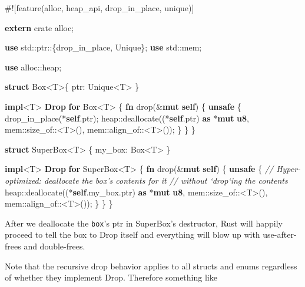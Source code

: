 \documentclass[a4paper,]{book}
\newenvironment{Shaded}{\begin{snugshade}}{\end{snugshade}}
\newcommand{\KeywordTok}[1]{\textcolor[rgb]{0.13,0.29,0.53}{\textbf{{#1}}}}
\newcommand{\CommentTok}[1]{\textcolor[rgb]{0.56,0.35,0.01}{\textit{{#1}}}}
\newcommand{\NormalTok}[1]{{#1}}
\begin{document}
\begin{Shaded}
\begin{Highlighting}[]
\NormalTok{#![feature(alloc, heap_api, drop_in_place, unique)]}

\KeywordTok{extern} \NormalTok{crate alloc;}

\KeywordTok{use} \NormalTok{std::ptr::\{drop_in_place, Unique\};}
\KeywordTok{use} \NormalTok{std::mem;}

\KeywordTok{use} \NormalTok{alloc::heap;}

\KeywordTok{struct} \NormalTok{Box<T>\{ ptr: Unique<T> \}}

\KeywordTok{impl}\NormalTok{<T> }\KeywordTok{Drop} \KeywordTok{for} \NormalTok{Box<T> \{}
    \KeywordTok{fn} \NormalTok{drop(&}\KeywordTok{mut} \KeywordTok{self}\NormalTok{) \{}
        \KeywordTok{unsafe} \NormalTok{\{}
            \NormalTok{drop_in_place(*}\KeywordTok{self}\NormalTok{.ptr);}
            \NormalTok{heap::deallocate((*}\KeywordTok{self}\NormalTok{.ptr) }\KeywordTok{as} \NormalTok{*}\KeywordTok{mut} \KeywordTok{u8}\NormalTok{,}
                             \NormalTok{mem::size_of::<T>(),}
                             \NormalTok{mem::align_of::<T>());}
        \NormalTok{\}}
    \NormalTok{\}}
\NormalTok{\}}

\KeywordTok{struct} \NormalTok{SuperBox<T> \{ my_box: Box<T> \}}

\KeywordTok{impl}\NormalTok{<T> }\KeywordTok{Drop} \KeywordTok{for} \NormalTok{SuperBox<T> \{}
    \KeywordTok{fn} \NormalTok{drop(&}\KeywordTok{mut} \KeywordTok{self}\NormalTok{) \{}
        \KeywordTok{unsafe} \NormalTok{\{}
            \CommentTok{// Hyper-optimized: deallocate the box's contents for it}
            \CommentTok{// without `drop`ing the contents}
            \NormalTok{heap::deallocate((*}\KeywordTok{self}\NormalTok{.my_box.ptr) }\KeywordTok{as} \NormalTok{*}\KeywordTok{mut} \KeywordTok{u8}\NormalTok{,}
                             \NormalTok{mem::size_of::<T>(),}
                             \NormalTok{mem::align_of::<T>());}
        \NormalTok{\}}
    \NormalTok{\}}
\NormalTok{\}}
\end{Highlighting}
\end{Shaded}

After we deallocate the \texttt{box}'s ptr in SuperBox's destructor,
Rust will happily proceed to tell the box to Drop itself and everything
will blow up with use-after-frees and double-frees.

Note that the recursive drop behavior applies to all structs and enums
regardless of whether they implement Drop. Therefore something like
\end{document}
